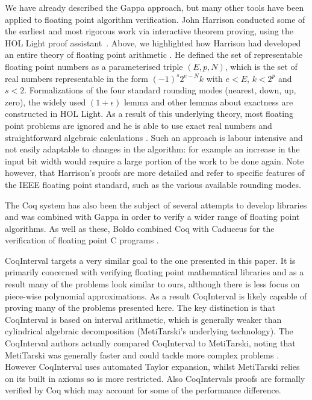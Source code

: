 \documentclass{fac}
\begin{document}
We have already described the Gappa approach, but many other tools have been applied to floating point algorithm verification. John Harrison conducted some of the earliest and most rigorous work via interactive theorem proving, using the HOL Light proof assistant~\cite{harrison1997floating}. Above, we highlighted how Harrison had developed an entire theory of floating point arithmetic \cite{harrison1999machine}. He defined the set of representable floating point numbers as a parameterised triple $(E,p,N)$, which is the set of real numbers representable in the form $(-1)^s 2^{e-N} k$ with $e<E$, $k<2^p$ and $s<2$. Formalizations of the four standard rounding modes (nearest, down, up, zero), the widely used $(1+\epsilon)$ lemma and other lemmas about exactness are constructed in HOL Light. As a result of this underlying theory, most floating point problems are ignored and he is able to use exact real numbers and straightforward algebraic calculations \cite{harrison1999machine}. Such an approach is labour intensive and not easily adaptable to changes in the algorithm: for example an increase in the input bit width would require a large portion of the work to be done again. Note however, that Harrison's proofs are more detailed and refer to specific features of the IEEE floating point standard, such as the various available rounding modes. 

 The Coq system has also been the subject of several attempts to develop libraries \cite{daumas2001generic,melquiond2012floating,boldo2011flocq} and was combined with Gappa \cite{boldo2009combining,daumas2010certification} in order to verify a wider range of floating point algorithms. As well as these, Boldo combined Coq with Caduceus for the verification of floating point C programs \cite{boldo2007formal}.
 
 CoqInterval \cite{martin2016proving} targets a very similar goal to the one presented in this paper. It is primarily concerned with verifying floating point mathematical libraries and as a result many of the problems look similar to ours, although there is less focus on piece-wise polynomial approximations. As a result CoqInterval is likely capable of proving many of the problems presented here. The key distinction is that CoqInterval is based on interval arithmetic, which is generally weaker than cylindrical algebraic decomposition (MetiTarski's underlying technology). The CoqInterval authors actually compared CoqInterval to MetiTarski, noting that MetiTarski was generally faster and could tackle more complex problems \cite{martin2016proving}. However CoqInterval uses automated Taylor expansion, whilst MetiTarski relies on its built in axioms so is more restricted. Also CoqIntervals proofs are formally verified by Coq which may account for some of the performance difference. 
 
\end{document}
